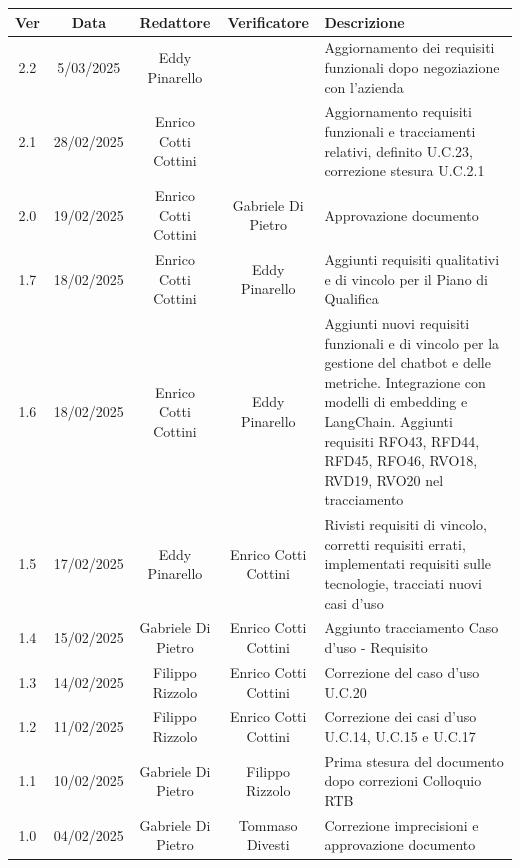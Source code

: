 \documentclass{article}
\begin{document}
\newpage
\begin{table}[h]
    \centering
    \renewcommand{\arraystretch}{1.2}
    \setlength{\tabcolsep}{5pt}
    \begin{tabular}{|c|c|c|c|m{}|}
        \hline
        \textbf{Ver} & \textbf{Data} & \textbf{Redattore} & \textbf{Verificatore} & \textbf{Descrizione} \\
        \hline
        2.2 & 5/03/2025 & Eddy Pinarello &  & Aggiornamento dei requisiti funzionali dopo negoziazione con l'azienda \\
        \hline
        2.1 & 28/02/2025 & Enrico Cotti Cottini &  &  Aggiornamento requisiti funzionali e tracciamenti relativi, definito U.C.23, correzione stesura U.C.2.1 \\
        \hline
        2.0 & 19/02/2025 & Enrico Cotti Cottini & Gabriele Di Pietro & Approvazione documento  \\
        \hline
        1.7 & 18/02/2025 & Enrico Cotti Cottini & Eddy Pinarello & Aggiunti requisiti qualitativi e di vincolo per il Piano di Qualifica \\
        \hline
        1.6 & 18/02/2025 & Enrico Cotti Cottini & Eddy Pinarello & Aggiunti nuovi requisiti funzionali e di vincolo per la gestione del chatbot e delle metriche. Integrazione con modelli di embedding e LangChain. Aggiunti requisiti RFO43, RFD44, RFD45, RFO46, RVO18, RVD19, RVO20 nel tracciamento \\
        \hline
        1.5 & 17/02/2025 & Eddy Pinarello & Enrico Cotti Cottini & Rivisti requisiti di vincolo, corretti requisiti errati, implementati requisiti sulle tecnologie, tracciati nuovi casi d'uso \\
        \hline
        1.4 & 15/02/2025 & Gabriele Di Pietro & Enrico Cotti Cottini & Aggiunto tracciamento Caso d'uso - Requisito \\
        \hline
        1.3 & 14/02/2025 & Filippo Rizzolo & Enrico Cotti Cottini & Correzione del caso d'uso U.C.20 \\
        \hline
        1.2 & 11/02/2025 & Filippo Rizzolo & Enrico Cotti Cottini & Correzione dei casi d'uso U.C.14, U.C.15 e U.C.17 \\
        \hline
        1.1 & 10/02/2025 & Gabriele Di Pietro & Filippo Rizzolo & Prima stesura del documento dopo correzioni Colloquio RTB \\
        \hline
        1.0 & 04/02/2025 & Gabriele Di Pietro & Tommaso Divesti & Correzione imprecisioni e approvazione documento \\

\end{tabular}
\end{table}
\end{document}
